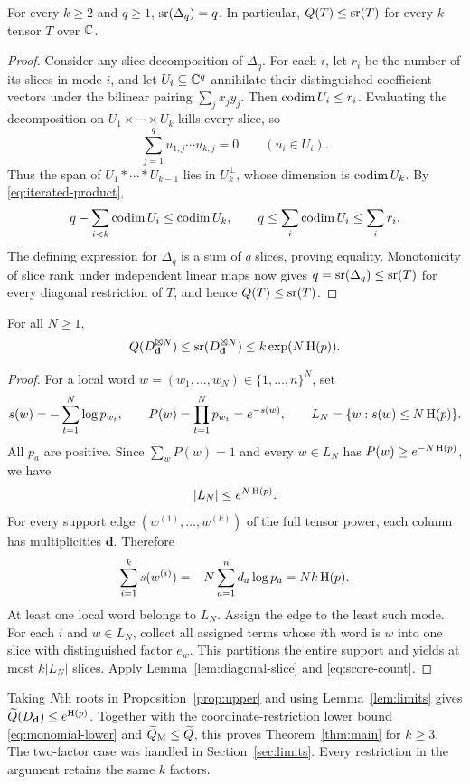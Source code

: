 \begin{lemma}\label{lem:diagonal-slice}
For every $k\geq2$ and $q\geq1$, $\operatorname{sr}(\Delta_q)=q$.
In particular, $Q(T)\leq\operatorname{sr}(T)$ for every $k$-tensor $T$ over $\mathbb C$.
\end{lemma}
\begin{proof}
Consider any slice decomposition of $\Delta_q$. For each $i$, let
$r_i$ be the number of its slices in mode $i$, and let $U_i\subseteq\mathbb C^q$
annihilate their distinguished coefficient vectors under the bilinear
pairing $\sum_j x_jy_j$. Then $\operatorname{codim} U_i\leq r_i$. Evaluating the
decomposition on $U_1\times\cdots\times U_k$ kills every slice, so
\[
 \sum_{j=1}^q u_{1,j}\cdots u_{k,j}=0
       \qquad (u_i\in U_i).
\]
Thus the span of $U_1*\cdots*U_{k-1}$ lies in $U_k^\perp$, whose
dimension is $\operatorname{codim} U_k$. By \eqref{eq:iterated-product},
\[
 q-\sum_{i<k}\operatorname{codim} U_i\leq\operatorname{codim} U_k,
       \qquad q\leq\sum_i\operatorname{codim} U_i\leq\sum_i r_i.
\]
The defining expression for $\Delta_q$ is a sum of $q$ slices, proving
equality. Monotonicity of slice rank under independent linear maps
now gives $q=\operatorname{sr}(\Delta_q)\leq\operatorname{sr}(T)$ for every diagonal restriction
of $T$, and hence $Q(T)\leq\operatorname{sr}(T)$.
\end{proof}

\begin{proposition}\label{prop:upper}
For all $N\geq1$,
\[
 Q(D_{\mathbf d}^{\boxtimes N})\leq
 \operatorname{sr}(D_{\mathbf d}^{\boxtimes N})\leq k\exp(N\operatorname{H}(p)).
\]
\end{proposition}
\begin{proof}
For a local word $w=(w_1,\ldots,w_N)\in\{1,\ldots,n\}^N$, set
\[
 s(w)=-\sum_{t=1}^N\log p_{w_t},\qquad
 P(w)=\prod_{t=1}^N p_{w_t}=e^{-s(w)},\qquad
 L_N=\{w:s(w)\leq N\operatorname{H}(p)\}.
\]
All $p_a$ are positive. Since $\sum_wP(w)=1$ and every $w\in L_N$
has $P(w)\geq e^{-N\operatorname{H}(p)}$, we have
\begin{equation}\label{eq:score-count}
 |L_N|\leq e^{N\operatorname{H}(p)}.
\end{equation}
For every support edge $(w^{(1)},\ldots,w^{(k)})$ of the full tensor
power, each column has multiplicities $\mathbf d$. Therefore
\[
 \sum_{i=1}^k s(w^{(i)})
    =-N\sum_{a=1}^n d_a\log p_a=Nk\operatorname{H}(p).
\]
At least one local word belongs to $L_N$. Assign the edge to the least
such mode. For each $i$ and $w\in L_N$, collect all assigned terms
whose $i$th word is $w$ into one slice with distinguished factor $e_w$.
This partitions the entire support and yields at most $k|L_N|$ slices.
Apply Lemma~\ref{lem:diagonal-slice} and \eqref{eq:score-count}.
\end{proof}

Taking $N$th roots in Proposition~\ref{prop:upper} and using
Lemma~\ref{lem:limits} gives $\widetilde Q(D_{\mathbf d})\leq e^{\operatorname{H}(p)}$.
Together with the coordinate-restriction lower bound
\eqref{eq:monomial-lower} and $\widetilde Q_{\mathrm M}\leq\widetilde Q$, this proves
Theorem~\ref{thm:main} for $k\geq3$. The two-factor case was handled
in Section~\ref{sec:limits}. Every restriction in the argument retains
the same $k$ factors.
